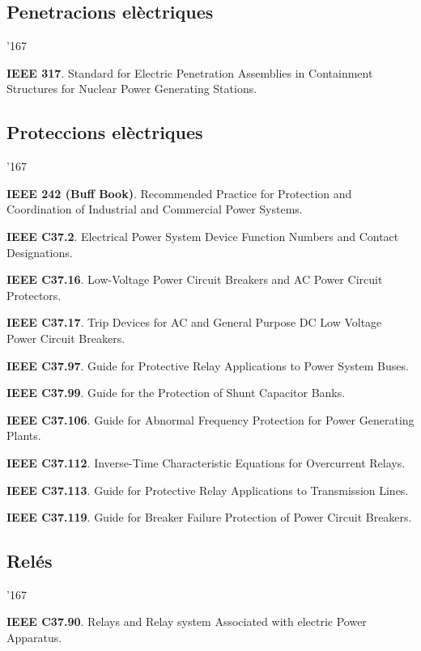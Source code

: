 \subsection*{Penetracions el\`{e}ctriques}
\begin{dinglist}{'167}
    \item \textbf{IEEE 317}. Standard for Electric Penetration Assemblies in Containment Structures for Nuclear Power Generating Stations.
\end{dinglist}


\subsection*{Proteccions el\`{e}ctriques}
\begin{dinglist}{'167}
    \item \textbf{IEEE 242 (Buff Book)}. Recommended Practice for Protection and Coordination of Industrial and Commercial Power Systems.
    \item \textbf{IEEE C37.2}. Electrical Power System Device Function Numbers and Contact Designations.
    \item \textbf{IEEE C37.16}. Low-Voltage Power Circuit Breakers and AC Power Circuit Protectors.
    \item \textbf{IEEE C37.17}. Trip Devices for AC and General Purpose DC Low Voltage Power Circuit Breakers.
    \item \textbf{IEEE C37.97}. Guide for Protective Relay Applications to Power System Buses.
    \item \textbf{IEEE C37.99}. Guide for the Protection of Shunt Capacitor Banks.
    \item \textbf{IEEE C37.106}. Guide for Abnormal Frequency Protection for Power Generating Plants.
    \item \textbf{IEEE C37.112}. Inverse-Time Characteristic Equations for Overcurrent Relays.
    \item \textbf{IEEE C37.113}. Guide for Protective Relay Applications to Transmission Lines.
    \item \textbf{IEEE C37.119}. Guide for Breaker Failure Protection of Power Circuit Breakers.
\end{dinglist}


\subsection*{Rel\'{e}s}
\begin{dinglist}{'167}
    \item \textbf{IEEE C37.90}. Relays and Relay system Associated with electric Power Apparatus.
\end{dinglist}


